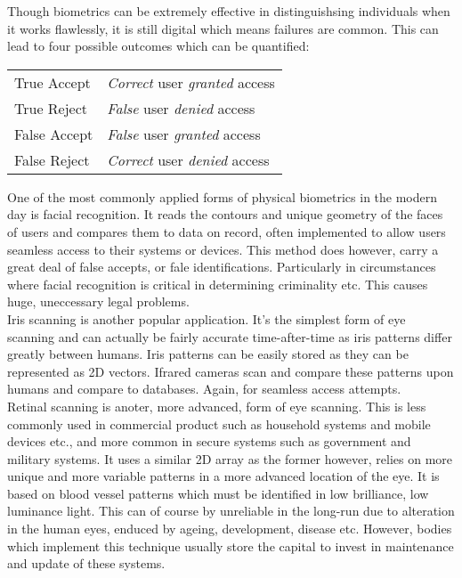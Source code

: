 \documentclass[11pt, english]{article}
\begin{document}
	Though biometrics can be extremely effective in distinguishsing individuals when it works flawlessly, it is still digital which means failures are common. This can lead to four possible outcomes which can be quantified:

	\begin{center}
	\begin{tabular}{l|l}
		\hline
		True Accept & \textit{Correct} user \textit{granted} access\\
		True Reject & \textit{False} user \textit{denied} access\\
		False Accept & \textit{False} user \textit{granted} access\\
		False Reject & \textit{Correct} user \textit{denied} access\\
		\hline
	\end{tabular}
	\end{center}

	One of the most commonly applied forms of physical biometrics in the modern day is facial recognition. It reads the contours and unique geometry of the faces of users and compares them to data on record, often implemented to allow users seamless access to their systems or devices. This method does however, carry a great deal of false accepts, or fale identifications. Particularly in circumstances where facial recognition is critical in determining criminality etc. This causes huge, uneccessary legal problems.\\

	Iris scanning is another popular application. It's the simplest form of eye scanning and can actually be fairly accurate time-after-time as iris patterns differ greatly between humans. Iris patterns can be easily stored as they can be represented as 2D vectors. Ifrared cameras scan and compare these patterns upon humans and compare to databases. Again, for seamless access attempts.\\

	Retinal scanning is anoter, more advanced, form of eye scanning. This is less commonly used in commercial product such as household systems and mobile devices etc., and more common in secure systems such as government and military systems. It uses a similar 2D array as the former however, relies on more unique and more variable patterns in a more advanced location of the eye. It is based on blood vessel patterns which must be identified in low brilliance, low luminance light. This can of course by unreliable in the long-run due to alteration in the human eyes, enduced by ageing, development, disease etc. However, bodies which implement this technique usually store the capital to invest in maintenance and update of these systems.\\
\end{document}
